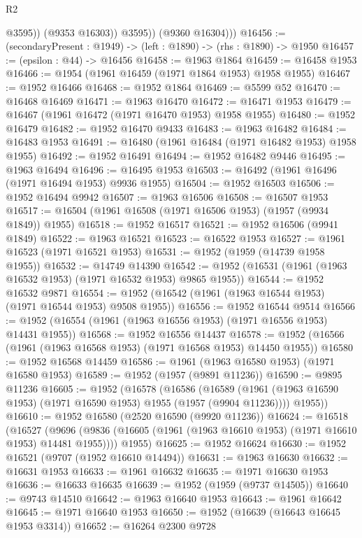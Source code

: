 \begin{lexlean}{R2}
\begin{coremodule}
                  @3595))
              (@9353 @16303))
            @3595))
        (@9360 @16304)))
@16456 := (secondaryPresent : @1949) -> (left : @1890) -> (rhs : @1890) -> @1950
@16457 := (epsilon : @44) -> @16456
@16458 := @1963 @1864
@16459 := @16458 @1953
@16466 := @1954 (@1961 @16459 (@1971 @1864 @1953) @1958 @1955)
@16467 := @1952 @16466
@16468 := @1952 @1864
@16469 := @5599 @52
@16470 := @16468 @16469
@16471 := @1963 @16470
@16472 := @16471 @1953
@16479 := @16467 (@1961 @16472 (@1971 @16470 @1953) @1958 @1955)
@16480 := @1952 @16479
@16482 := @1952 @16470 @9433
@16483 := @1963 @16482
@16484 := @16483 @1953
@16491 := @16480 (@1961 @16484 (@1971 @16482 @1953) @1958 @1955)
@16492 := @1952 @16491
@16494 := @1952 @16482 @9446
@16495 := @1963 @16494
@16496 := @16495 @1953
@16503 := @16492 (@1961 @16496 (@1971 @16494 @1953) @9936 @1955)
@16504 := @1952 @16503
@16506 := @1952 @16494 @9942
@16507 := @1963 @16506
@16508 := @16507 @1953
@16517 := @16504 (@1961 @16508 (@1971 @16506 @1953) (@1957 (@9934 @1849)) @1955)
@16518 := @1952 @16517
@16521 := @1952 @16506 (@9941 @1849)
@16522 := @1963 @16521
@16523 := @16522 @1953
@16527 := @1961 @16523 (@1971 @16521 @1953)
@16531 := @1952 (@1959 (@14739 @1958 @1955))
@16532 := @14749 @14390
@16542 := @1952 (@16531 (@1961 (@1963 @16532 @1953) (@1971 @16532 @1953) @9865 @1955))
@16544 := @1952 @16532 @9871
@16554 := @1952 (@16542 (@1961 (@1963 @16544 @1953) (@1971 @16544 @1953) @9508 @1955))
@16556 := @1952 @16544 @9514
@16566 := @1952 (@16554 (@1961 (@1963 @16556 @1953) (@1971 @16556 @1953) @14431 @1955))
@16568 := @1952 @16556 @14437
@16578 := @1952 (@16566 (@1961 (@1963 @16568 @1953) (@1971 @16568 @1953) @14450 @1955))
@16580 := @1952 @16568 @14459
@16586 := @1961 (@1963 @16580 @1953) (@1971 @16580 @1953)
@16589 := @1952 (@1957 (@9891 @11236))
@16590 := @9895 @11236
@16605 := @1952
    (@16578
      (@16586
        (@16589 (@1961 (@1963 @16590 @1953) (@1971 @16590 @1953) @1955 (@1957 (@9904 @11236))))
        @1955))
@16610 := @1952 @16580 (@2520 @16590 (@9920 @11236))
@16624 := @16518
    (@16527
      (@9696 (@9836 (@16605 (@1961 (@1963 @16610 @1953) (@1971 @16610 @1953) @14481 @1955))))
      @1955)
@16625 := @1952 @16624
@16630 := @1952 @16521 (@9707 (@1952 @16610 @14494))
@16631 := @1963 @16630
@16632 := @16631 @1953
@16633 := @1961 @16632
@16635 := @1971 @16630 @1953
@16636 := @16633 @16635
@16639 := @1952 (@1959 (@9737 @14505))
@16640 := @9743 @14510
@16642 := @1963 @16640 @1953
@16643 := @1961 @16642
@16645 := @1971 @16640 @1953
@16650 := @1952 (@16639 (@16643 @16645 @1953 @3314))
@16652 := @16264 @2300 @9728

\end{coremodule}
\end{lexlean}
